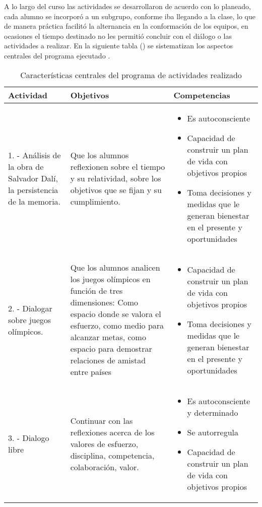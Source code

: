 \documentclass{textolivre}
\begin{document}
A lo largo del curso las actividades se desarrollaron de acuerdo con lo planeado, cada alumno se incorporó a un subgrupo, conforme iba llegando a la clase, lo que de manera práctica facilitó la alternancia en la conformación de los equipos, en ocasiones el tiempo destinado no les permitió concluir con el diálogo o las actividades a realizar. En la siguiente tabla () se sistematizan los aspectos centrales del programa ejecutado \cite{mikulic2015}.

\begin{longtable}{p{}p{}p{}}
\caption{Características centrales del programa de actividades realizado}
\label{tab1}
\\
\toprule
Actividad & Objetivos & Competencias 
\\
\midrule
\arrayrulecolor[gray]{.7}
1. - Análisis de la obra de Salvador Dalí, la persistencia de la memoria. & Que los alumnos reflexionen sobre el tiempo y su relatividad, sobre los objetivos que se fijan y su cumplimiento. & \begin{itemize}
\item Es autoconsciente
\item Capacidad de construir un plan de vida con objetivos propios
\item Toma decisiones y medidas que le generan bienestar en el presente y oportunidades
\end{itemize} 
\\
\midrule
2. - Dialogar sobre juegos olímpicos. & Que los alumnos analicen los juegos olímpicos en función de tres dimensiones: Como espacio donde se valora el esfuerzo, como medio para alcanzar metas, como espacio para demostrar relaciones de amistad entre países &
\begin{itemize}
\item Capacidad de construir un plan de vida con objetivos propios
\item Toma decisiones y medidas que le generan bienestar en el presente y oportunidades
\end{itemize}
\\
\midrule
3. - Dialogo libre & Continuar con las reflexiones acerca de los valores de esfuerzo, disciplina, competencia, colaboración, valor. &
\begin{itemize}
\item Es autoconsciente y determinado 
\item Se autorregula
\item Capacidad de construir un plan de vida con objetivos propios

\end{itemize}
\end{longtable}
\end{document}
